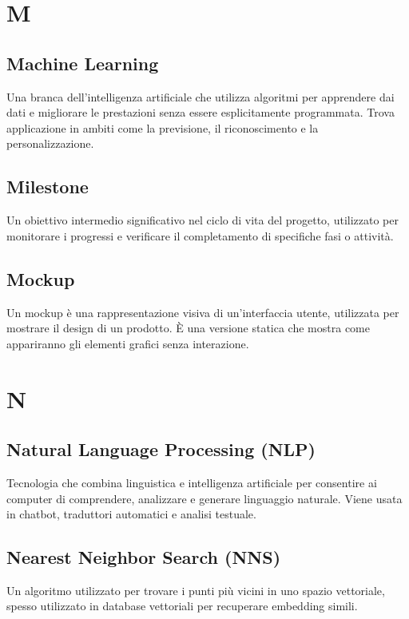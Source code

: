 \documentclass{article}
\begin{document}
\newpage

\section{M}

\subsection{Machine Learning}
Una branca dell’intelligenza artificiale che utilizza algoritmi per apprendere dai dati e migliorare le prestazioni senza essere esplicitamente programmata. Trova applicazione in ambiti come la previsione, il riconoscimento e la personalizzazione.

\subsection{Milestone}
Un obiettivo intermedio significativo nel ciclo di vita del progetto, utilizzato per monitorare i progressi e verificare il completamento di specifiche fasi o attività.

\subsection{Mockup}
Un mockup è una rappresentazione visiva di un'interfaccia utente, utilizzata per mostrare il design di un prodotto. È una versione statica che mostra come appariranno gli elementi grafici senza interazione.

\newpage

\section{N}

\subsection{Natural Language Processing (NLP)}
Tecnologia che combina linguistica e intelligenza artificiale per consentire ai computer di comprendere, analizzare e generare linguaggio naturale. Viene usata in chatbot, traduttori automatici e analisi testuale.

\subsection{Nearest Neighbor Search (NNS)}
Un algoritmo utilizzato per trovare i punti più vicini in uno spazio vettoriale, spesso utilizzato in database vettoriali per recuperare embedding simili.
\end{document}
